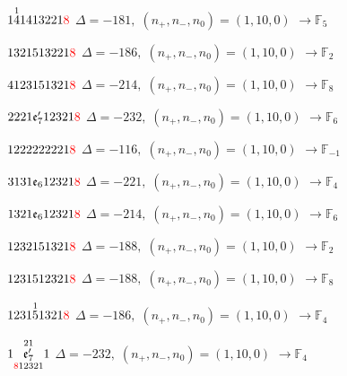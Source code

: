 \documentclass[10pt]{article}
\begin{document}
\smallskip

$1\overset{1}{4}1413221\textcolor{red}{8}$ \quad $\Delta=-181,\; (n_+,n_-,n_0)=(1,10,0)$ \quad $\to \mathbb{F}_{5}$

\smallskip

$1321513221\textcolor{red}{8}$ \quad $\Delta=-186,\; (n_+,n_-,n_0)=(1,10,0)$ \quad $\to \mathbb{F}_{2}$

\smallskip

$4123151321\textcolor{red}{8}$ \quad $\Delta=-214,\; (n_+,n_-,n_0)=(1,10,0)$ \quad $\to \mathbb{F}_{8}$

\smallskip

$2221\mathfrak{e}_7'12321\textcolor{red}{8}$ \quad $\Delta=-232,\; (n_+,n_-,n_0)=(1,10,0)$ \quad $\to \mathbb{F}_{6}$

\smallskip

$1222222221\textcolor{red}{8}$ \quad $\Delta=-116,\; (n_+,n_-,n_0)=(1,10,0)$ \quad $\to \mathbb{F}_{-1}$

\smallskip

$3131\mathfrak{e}_612321\textcolor{red}{8}$ \quad $\Delta=-221,\; (n_+,n_-,n_0)=(1,10,0)$ \quad $\to \mathbb{F}_{4}$

\smallskip

$1321\mathfrak{e}_612321\textcolor{red}{8}$ \quad $\Delta=-214,\; (n_+,n_-,n_0)=(1,10,0)$ \quad $\to \mathbb{F}_{6}$

\smallskip

$1232151321\textcolor{red}{8}$ \quad $\Delta=-188,\; (n_+,n_-,n_0)=(1,10,0)$ \quad $\to \mathbb{F}_{2}$

$1231512321\textcolor{red}{8}$ \quad $\Delta=-188,\; (n_+,n_-,n_0)=(1,10,0)$ \quad $\to \mathbb{F}_{8}$

\smallskip

$1231\overset{1}{5}1321\textcolor{red}{8}$ \quad $\Delta=-186,\; (n_+,n_-,n_0)=(1,10,0)$ \quad $\to \mathbb{F}_{4}$

\smallskip

$1\overset{21}{\underset{\textcolor{red}{8}12321}{\mathfrak{e}_7'}}1$ \quad $\Delta=-232,\; (n_+,n_-,n_0)=(1,10,0)$ \quad $\to \mathbb{F}_{4}$
\end{document}
